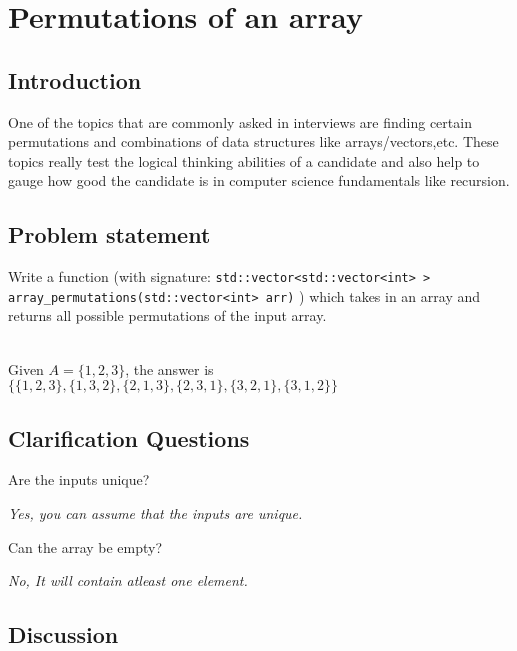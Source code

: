 

\chapter{Permutations of an array}
\label{ch:permutations_array}
\section*{Introduction}
One of the topics that are commonly asked in interviews are finding certain permutations and combinations of data structures like arrays/vectors,etc. These topics really test the logical thinking abilities of a candidate and also help to gauge how good the candidate is in computer science fundamentals like recursion.

\section{Problem statement}
\begin{exercise}
Write a function (with signature: \lstinline[columns=fixed]{std::vector<std::vector<int> > array_permutations(std::vector<int> arr)} ) which takes in an array and returns all possible permutations of the input array.
\end{exercise}

\begin{example}
	   \hfill \\
	   Given $A=\{1,2,3\}$, the answer is 
	   $\{\{1,2,3\},\{1,3,2\},\{2,1,3\},\{2,3,1\},\{3,2,1\},\{3,1,2\}\}$
\end{example}

\section{Clarification Questions}
\begin{QandA}
	\item Are the inputs unique?
	\begin{answered}
		\textit{Yes, you can assume that the inputs are unique.}
	\end{answered}
	\item Can the array be empty?
	\begin{answered}
		\textit{No, It will contain atleast one element.}
	\end{answered}
\end{QandA}

\section{Discussion}


